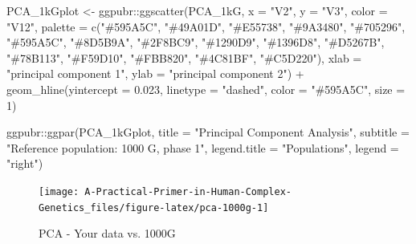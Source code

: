 \documentclass[
]{book}
\newenvironment{Shaded}{\begin{snugshade}}{\end{snugshade}}
\newcommand{\AttributeTok}[1]{\textcolor[rgb]{0.77,0.63,0.00}{#1}}
\newcommand{\DecValTok}[1]{\textcolor[rgb]{0.00,0.00,0.81}{#1}}
\newcommand{\FloatTok}[1]{\textcolor[rgb]{0.00,0.00,0.81}{#1}}
\newcommand{\FunctionTok}[1]{\textcolor[rgb]{0.00,0.00,0.00}{#1}}
\newcommand{\NormalTok}[1]{#1}
\newcommand{\OtherTok}[1]{\textcolor[rgb]{0.56,0.35,0.01}{#1}}
\newcommand{\SpecialCharTok}[1]{\textcolor[rgb]{0.00,0.00,0.00}{#1}}
\newcommand{\StringTok}[1]{\textcolor[rgb]{0.31,0.60,0.02}{#1}}
\begin{document}
\begin{Shaded}
\begin{Highlighting}[]
\NormalTok{PCA\_1kGplot }\OtherTok{\textless{}{-}}\NormalTok{ ggpubr}\SpecialCharTok{::}\FunctionTok{ggscatter}\NormalTok{(PCA\_1kG, }\AttributeTok{x =} \StringTok{"V2"}\NormalTok{, }\AttributeTok{y =} \StringTok{"V3"}\NormalTok{,}
                                 \AttributeTok{color =} \StringTok{"V12"}\NormalTok{,}
                                 \AttributeTok{palette =} \FunctionTok{c}\NormalTok{(}\StringTok{"\#595A5C"}\NormalTok{, }\StringTok{"\#49A01D"}\NormalTok{, }\StringTok{"\#E55738"}\NormalTok{, }\StringTok{"\#9A3480"}\NormalTok{, }\StringTok{"\#705296"}\NormalTok{, }
                                             \StringTok{"\#595A5C"}\NormalTok{, }\StringTok{"\#8D5B9A"}\NormalTok{, }\StringTok{"\#2F8BC9"}\NormalTok{, }\StringTok{"\#1290D9"}\NormalTok{, }\StringTok{"\#1396D8"}\NormalTok{, }
                                             \StringTok{"\#D5267B"}\NormalTok{, }\StringTok{"\#78B113"}\NormalTok{, }\StringTok{"\#F59D10"}\NormalTok{, }\StringTok{"\#FBB820"}\NormalTok{, }\StringTok{"\#4C81BF"}\NormalTok{, }\StringTok{"\#C5D220"}\NormalTok{),}
                                 \AttributeTok{xlab =} \StringTok{"principal component 1"}\NormalTok{, }\AttributeTok{ylab =} \StringTok{"principal component 2"}\NormalTok{) }\SpecialCharTok{+}
  \FunctionTok{geom\_hline}\NormalTok{(}\AttributeTok{yintercept =} \FloatTok{0.023}\NormalTok{, }\AttributeTok{linetype =} \StringTok{"dashed"}\NormalTok{,}
                \AttributeTok{color =} \StringTok{"\#595A5C"}\NormalTok{, }\AttributeTok{size =} \DecValTok{1}\NormalTok{)}

\NormalTok{  ggpubr}\SpecialCharTok{::}\FunctionTok{ggpar}\NormalTok{(PCA\_1kGplot,}
                \AttributeTok{title =} \StringTok{"Principal Component Analysis"}\NormalTok{,}
                \AttributeTok{subtitle =} \StringTok{"Reference population: 1000 G, phase 1"}\NormalTok{,}
                \AttributeTok{legend.title =} \StringTok{"Populations"}\NormalTok{, }\AttributeTok{legend =} \StringTok{"right"}\NormalTok{)}
\end{Highlighting}
\end{Shaded}

\begin{figure}

{\centering \texttt{[image: A-Practical-Primer-in-Human-Complex-Genetics\_files/figure-latex/pca-1000g-1]} 

}

\caption{PCA - Your data vs. 1000G}\label{fig:pca-1000g}
\end{figure}
\end{document}
